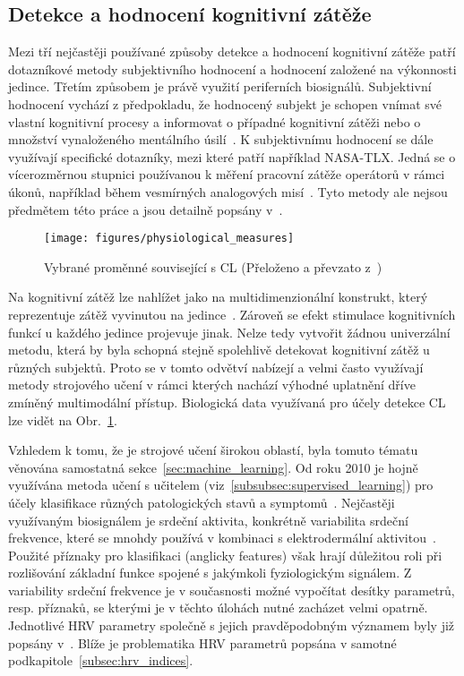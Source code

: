\subsection{Detekce a hodnocení kognitivní zátěže}
\label{subsec:detekce_CL}
Mezi tří nejčastěji používané způsoby detekce a hodnocení kognitivní zátěže
patří dotazníkové metody subjektivního hodnocení a hodnocení založené na
výkonnosti jedince. Třetím způsobem je právě využití periferních biosignálů.
Subjektivní hodnocení vychází z předpokladu, že hodnocený subjekt je schopen
vnímat své vlastní kognitivní procesy a informovat o případné kognitivní zátěži
nebo o množství vynaloženého mentálního úsilí~\cite{Wang2019,Schnotz2007}. K
subjektivnímu hodnocení se dále využívají specifické dotazníky, mezi které patří
například NASA-TLX. Jedná se o vícerozměrnou stupnici používanou k měření
pracovní zátěže operátorů v rámci úkonů, například během vesmírných analogových
misí~\cite{Sandra2006}. Tyto metody ale nejsou předmětem této práce a jsou
detailně popsány v~\cite{Schnotz2007}.

\begin{figure}[!htb]
    \begin{center}
        \texttt{[image: figures/physiological\_measures]}
        \caption{Vybrané proměnné související s \gls{CL} (Přeloženo a převzato
            z~\cite{Giannakakis2022})}
        \label{fig:physiological_measures}
    \end{center}
\end{figure}

Na kognitivní zátěž lze nahlížet jako na multidimenzionální konstrukt, který
reprezentuje zátěž vyvinutou na jedince~\cite{Wang2019}. Zároveň se efekt
stimulace kognitivních funkcí u každého jedince projevuje jinak. Nelze tedy
vytvořit žádnou univerzální metodu, která by byla schopná stejně spolehlivě
detekovat kognitivní zátěž u různých subjektů. Proto se v tomto odvětví nabízejí
a velmi často využívají metody strojového učení v rámci kterých nachází výhodné
uplatnění dříve zmíněný multimodální přístup. Biologická data využívaná pro
účely detekce \gls{CL} lze vidět na Obr.~\ref{fig:physiological_measures}.

Vzhledem k tomu, že je strojové učení širokou oblastí, byla tomuto tématu
věnována samostatná sekce~\ref{sec:machine_learning}. Od roku 2010 je hojně
využívána metoda učení s učitelem (viz~\ref{subsubsec:supervised_learning}) pro
účely klasifikace různých patologických stavů a symptomů~\cite{Ishaque2021}.
Nejčastěji využívaným biosignálem je srdeční aktivita, konkrétně variabilita
srdeční frekvence, které se mnohdy používá v kombinaci s elektrodermální
aktivitou~\cite{Wang2019}. Použité příznaky pro klasifikaci (anglicky features)
však hrají důležitou roli při rozlišování základní funkce spojené s jakýmkoli
fyziologickým signálem. Z variability srdeční frekvence je v současnosti možné
vypočítat desítky parametrů, resp. příznaků, se kterými je v těchto úlohách
nutné zacházet velmi opatrně. Jednotlivé \gls{HRV} parametry společně s jejich
pravděpodobným významem byly již popsány
v~\cite{Haapalainen2010,Rohila2020,Pham2021,Bouny2021}. Blíže je problematika
\gls{HRV} parametrů popsána v samotné podkapitole~\ref{subsec:hrv_indices}.

